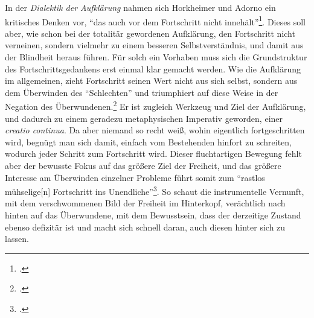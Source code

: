\documentclass[a4paper, 12pt]{article}
\begin{document}
\begin{onehalfspace}
In der \emph{Dialektik der Aufklärung} nahmen sich Horkheimer und Adorno ein kritisches Denken vor, "`das auch vor dem Fortschritt nicht innehält"'\footnote{\Cite[Siehe][S. IX ("`Zur Neuausgabe"')]{dialektik-der-aufklaerung}.}. Dieses soll aber, wie schon bei der totalitär gewordenen Aufklärung, den Fortschritt nicht verneinen, sondern vielmehr zu einem besseren Selbstverständnis, und damit aus der Blindheit heraus führen. Für solch ein Vorhaben muss sich die Grundstruktur des Fortschrittsgedankens erst einmal klar gemacht werden. Wie die Aufklärung im allgemeinen, zieht Fortschritt seinen Wert nicht aus sich selbst, sondern aus dem Überwinden des "`Schlechten"' und triumphiert auf diese Weise in der Negation des Überwundenen.\footnote{\Cite[Vgl.][S. 638]{fortschritt}.} Er ist zugleich Werkzeug und Ziel der Aufklärung, und dadurch zu einem geradezu metaphysischen Imperativ geworden, einer \emph{creatio continua}. Da aber niemand so recht weiß, wohin eigentlich fortgeschritten wird, begnügt man sich damit, einfach vom Bestehenden hinfort zu schreiten, wodurch jeder Schritt zum Fortschritt wird. Dieser fluchtartigen Bewegung fehlt aber der bewusste Fokus auf das größere Ziel der Freiheit, und das größere Interesse am Überwinden einzelner Probleme führt somit zum "`rastlos mühselige[n] Fortschritt ins Unendliche"'\footnote{\Cite[Siehe][S. 32]{dialektik-der-aufklaerung}.}. So schaut die instrumentelle Vernunft, mit dem verschwommenen Bild der Freiheit im Hinterkopf, verächtlich nach hinten auf das Überwundene, mit dem Bewusstsein, dass der derzeitige Zustand ebenso defizitär ist und macht sich schnell daran, auch diesen hinter sich zu lassen. 


\end{onehalfspace}
\end{document}
